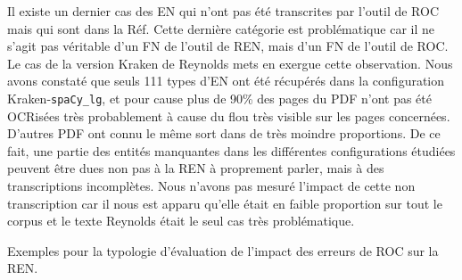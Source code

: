 


%  

%  
%  

%
%    

Il existe un dernier cas des EN qui n'ont pas été transcrites par l'outil de ROC mais qui sont dans la Réf. Cette dernière catégorie est problématique car il ne s'agit pas véritable d'un FN de l'outil de REN, mais d'un FN de l'outil de ROC. 
Le cas de la version Kraken de Reynolds mets en exergue cette observation. Nous avons constaté que seuls 111 types d'EN ont été récupérés dans la configuration Kraken-\texttt{spaCy\_lg}, et pour cause plus de 90\% des pages du PDF n'ont pas été OCRisées très probablement à cause du flou très visible sur les pages concernées. D'autres PDF ont connu le même sort dans de très moindre proportions. De ce fait, une partie des entités manquantes dans les différentes configurations étudiées peuvent être dues non pas à la REN à proprement parler, mais à des transcriptions incomplètes. Nous n'avons pas mesuré l'impact de cette non transcription car il nous est apparu qu'elle était en faible proportion sur tout le corpus et le texte Reynolds était le seul cas très problématique. 


\begin{table}[h!]
    \centering
    

    \caption{Exemples pour la typologie d'évaluation de l'impact des erreurs de ROC sur la REN.}
    \label{tab:typo_eval}
\end{table}




